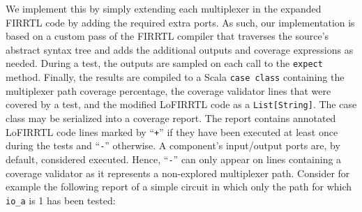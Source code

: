 \documentclass[a4paper]{IEEEtran}
\begin{document}
We implement this by simply extending each multiplexer in the expanded FIRRTL code by adding the required extra ports. %
As such, our implementation is based on a custom pass of the FIRRTL compiler that traverses the source's abstract syntax tree and adds the additional outputs and coverage expressions as needed. During a test, the outputs are sampled on each call to the \texttt{expect} method. Finally, the results are compiled to a Scala \texttt{case class} containing %
the multiplexer path coverage percentage, the coverage validator lines that were covered by a test, and the modified LoFIRRTL code as a \texttt{List[String]}.
The case class may be serialized into a coverage report. The report contains annotated LoFIRRTL code lines marked by ``\texttt{+}'' if they have been executed at least once during the tests and ``\texttt{-}'' otherwise. A component's input/output ports are, by default, considered executed. Hence, ``\texttt{-}'' can only appear on lines containing a coverage validator as it represents a non-explored multiplexer path. Consider for example the following report of a simple circuit in which only the path for which \texttt{io\_a} is 1 has been tested:
\end{document}
